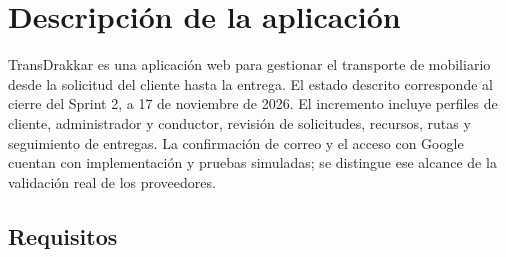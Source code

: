\chapter{Descripción de la aplicación}
TransDrakkar es una aplicación web para gestionar el transporte de mobiliario desde la solicitud del cliente hasta la entrega. El estado descrito corresponde al cierre del Sprint 2, a 17 de noviembre de 2026. El incremento incluye perfiles de cliente, administrador y conductor, revisión de solicitudes, recursos, rutas y seguimiento de entregas. La confirmación de correo y el acceso con Google cuentan con implementación y pruebas simuladas; se distingue ese alcance de la validación real de los proveedores.

\section{Requisitos}
